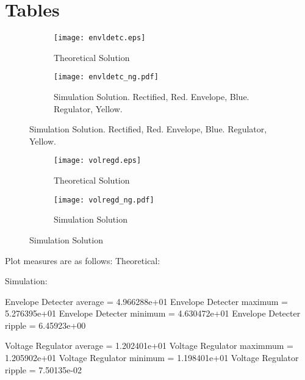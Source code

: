 \section{Tables}
\label{sec:tables}

\begin{figure}[H]
\centering
\caption{Plots from theoretical and simulation analysis}
\begin{subfigure}{\textwidth}
\centering
\texttt{[image: envldetc.eps]}
\caption{Theoretical Solution}
\end{subfigure}
\begin{subfigure}{\textwidth}
\centering
\texttt{[image: envldetc\_ng.pdf]}
\caption{Simulation Solution. Rectified, Red. Envelope, Blue. Regulator, Yellow.}
\end{subfigure}
\end{figure}

\begin{figure}[H]
\centering
\caption{Solution - 12}
\begin{subfigure}{\textwidth}
\centering
\texttt{[image: volregd.eps]}
\caption{Theoretical Solution}
\end{subfigure}
\begin{subfigure}{\textwidth}
\centering
\texttt{[image: volregd\_ng.pdf]}
\caption{Simulation Solution}
\end{subfigure}
\end{figure}

Plot measures are as follows:
Theoretical:

Simulation:

Envelope Detecter average =  4.966288e+01 
Envelope Detecter maximum =  5.276395e+01
Envelope Detecter minimum =  4.630472e+01
Envelope Detecter ripple =  6.45923e+00

Voltage Regulator average =  1.202401e+01
Voltage Regulator maximmum =  1.205902e+01
Voltage Regulator minimum =  1.198401e+01
Voltage Regulator ripple  =  7.50135e-02
